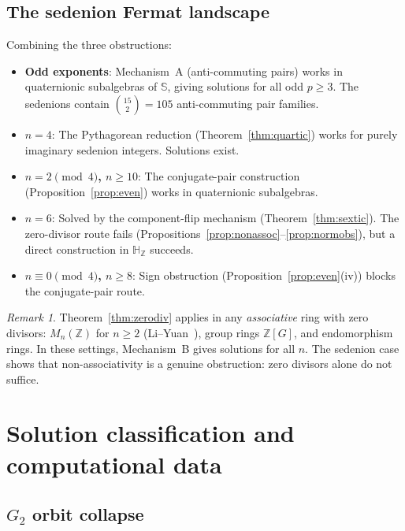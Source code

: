 \documentclass[11pt]{amsart}
\theoremstyle{plain}
\theoremstyle{definition}
\theoremstyle{remark}
\newtheorem{remark}[theorem]{Remark}
\newcommand{\Z}{\mathbb{Z}}
\newcommand{\HH}{\mathbb{H}}
\newcommand{\Se}{\mathbb{S}}
\begin{document}
\subsection{The sedenion Fermat landscape}

Combining the three obstructions:
\begin{itemize}
  \item \textbf{Odd exponents}: Mechanism~A (anti-commuting pairs) works
    in quaternionic subalgebras of $\Se$, giving solutions for all odd $p \geq 3$.
    The sedenions contain $\binom{15}{2} = 105$ anti-commuting pair families.
  \item \textbf{$n = 4$}: The Pythagorean reduction (Theorem~\ref{thm:quartic})
    works for purely imaginary sedenion integers. Solutions exist.
  \item \textbf{$n = 2 \pmod{4}$, $n \geq 10$}: The conjugate-pair construction
    (Proposition~\ref{prop:even}) works in quaternionic subalgebras.
  \item \textbf{$n = 6$}: Solved by the component-flip mechanism
    (Theorem~\ref{thm:sextic}). The zero-divisor route fails
    (Propositions~\ref{prop:nonassoc}--\ref{prop:normobs}),
    but a direct construction in $\HH_\Z$ succeeds.
  \item \textbf{$n \equiv 0 \pmod{4}$, $n \geq 8$}: Sign obstruction
    (Proposition~\ref{prop:even}(iv)) blocks the conjugate-pair route.
\end{itemize}

\begin{remark}
Theorem~\ref{thm:zerodiv} applies in any \emph{associative} ring with zero divisors:
$M_n(\Z)$ for $n \geq 2$ (Li--Yuan~\cite{LiYuan2025}), group rings $\Z[G]$,
and endomorphism rings. In these settings, Mechanism~B gives solutions for all $n$.
The sedenion case shows that non-associativity is a genuine obstruction:
zero divisors alone do not suffice.
\end{remark}



\section{Solution classification and computational data}\label{sec:classification}

\subsection{$G_2$ orbit collapse}
\end{document}
